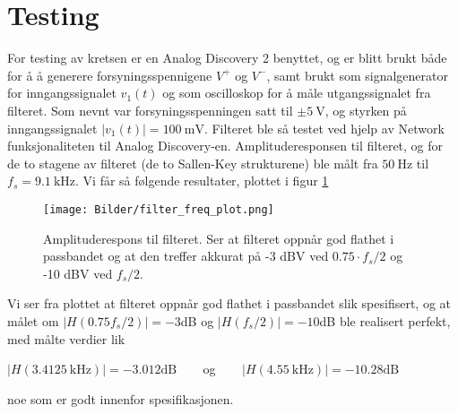 \section{Testing}
\label{testing}

For testing av kretsen er en Analog Discovery 2 benyttet, og er blitt brukt både for å å generere forsyningsspennigene $V^+$ og $V^-$, samt brukt som signalgenerator for inngangssignalet $v_1(t)$ og som oscilloskop for å måle utgangssignalet fra filteret.
Som nevnt var forsyningsspenningen satt til $\pm \SI{5}{\volt}$, og styrken på inngangssignalet $|v_1(t)| = \SI{100}{\milli\volt}$. Filteret ble så testet ved hjelp av Network funksjonaliteten til Analog Discovery-en. Amplituderesponsen til filteret, og for de to 
stagene av filteret (de to Sallen-Key strukturene) ble målt fra $\SI{50}{\hertz}$ til $f_s = \SI{9.1}{\kilo\hertz}$. Vi får så følgende resultater, plottet i figur \ref{fig:filter-freq-plot}

\begin{figure}[H]
    \centering
    \texttt{[image: Bilder/filter\_freq\_plot.png]}
    \caption{Amplituderespons til filteret. Ser at filteret oppnår god flathet i passbandet og at den treffer akkurat 
    på -3 dBV ved $0.75 \cdot f_s/2$ og -10 dBV ved $f_s/2$.}
    \label{fig:filter-freq-plot}
\end{figure}

Vi ser fra plottet at filteret oppnår god flathet i passbandet slik spesifisert, og at målet om $|H(0.75 f_s / 2)| = -3$dB og $|H(f_s/2)| = -10$dB ble realisert perfekt, med målte verdier lik
\begin{center}
    $|H(\SI{3.4125}{\kilo\hertz})| = -3.012\text{dB}\:\:\:\:\:\:\:\:$ og $\:\:\:\:\:\:\:\:|H(\SI{4.55}{\kilo\hertz})| = -10.28\text{dB}$
\end{center}
noe som er godt innenfor spesifikasjonen.
